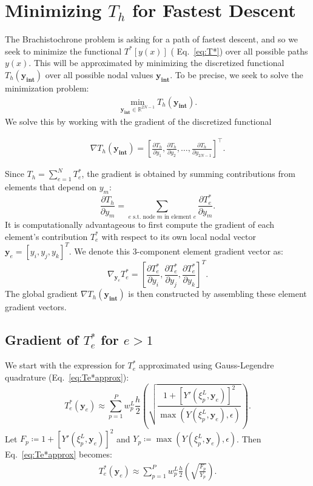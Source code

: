 \documentclass[11pt]{article}
\begin{document}
\section{Minimizing $ T_h $ for Fastest Descent}
The Brachistochrone problem is asking for a path of fastest descent, and so we seek to minimize the functional \( T^*[y(x)] \) ( Eq.~\eqref{eq:T*}) over all possible paths \( y(x) \). This will be approximated by minimizing the discretized functional \( T_h(\mathbf{y_\text{int}}) \) over all possible nodal values \( \mathbf{y_\text{int}} \). To be precise, we seek to solve the minimization problem:
\begin{align} 
     \min_{\mathbf{y_\text{int}} \in \mathbb{R}^{2N-1}} T_h(\mathbf{y_\text{int}}). \label{eq:minT}
\end{align}
We solve this by working with the gradient of the discretized functional 
 
\begin{align} 
    \nabla T_h(\mathbf{y_\text{int}}) = \left[ \frac{\partial T_h}{\partial y_1}, \frac{\partial T_h}{\partial y_2}, \ldots, \frac{\partial T_h}{\partial y_{2N-1}} \right]^\top. \label{eq:gradT} 
\end{align}

Since \( T_h = \sum_{e=1}^{N} T_e^* \), the gradient is obtained by summing contributions from elements that depend on \( y_m \):
\[ 
    \frac{\partial T_h}{\partial y_m} = \sum_{e \text{ s.t. node } m \text{ in element } e} \frac{\partial T_e^*}{\partial y_m}.
\]
It is computationally advantageous to first compute the gradient of each element's contribution \( T_e^* \) with respect to its own local nodal vector \( \mathbf{y}_e = [y_i, y_j, y_k]^T \). We denote this 3-component element gradient vector as:
\[ 
    \nabla_{\mathbf{y}_e} T_e^* = \left[ \frac{\partial T_e^*}{\partial y_i}, \frac{\partial T_e^*}{\partial y_j}, \frac{\partial T_e^*}{\partial y_k} \right]^T. 
\]
The global gradient \( \nabla T_h(\mathbf{y_\text{int}}) \) is then constructed by assembling these element gradient vectors.

\subsection{Gradient of $ T^{*}_e  $ for $ e > 1 $}
We start with the expression for \( T_e^* \) approximated using Gauss-Legendre quadrature (Eq.~\eqref{eq:Te*approx}):
\[ 
    T_e^*(\mathbf{y}_e) \approx \sum_{p=1}^{P} w_{p}^{L} \frac{h}{2} \left( \sqrt{\frac{1 + [Y'(\xi_{p}^{L}, \mathbf{y}_e)]^2}{ \max(Y(\xi_{p}^{L}, \mathbf{y}_e), \epsilon) }} \right) .
\]
Let \( F_p \coloneqq 1 + [Y'(\xi_p^L, \mathbf{y}_e)]^2 \) and \( Y_p \coloneqq \max(Y(\xi_p^L, \mathbf{y}_e), \epsilon) \). Then Eq.~\eqref{eq:Te*approx} becomes:  
\begin{align} 
    T_e^*(\mathbf{y}_e) \approx \sum_{p=1}^{P} w_{p}^{L} \frac{h}{2} \left( \sqrt{\frac{F_p}{Y_p}} \right) . \label{eq:Te*approx2}
\end{align}
\end{document}
